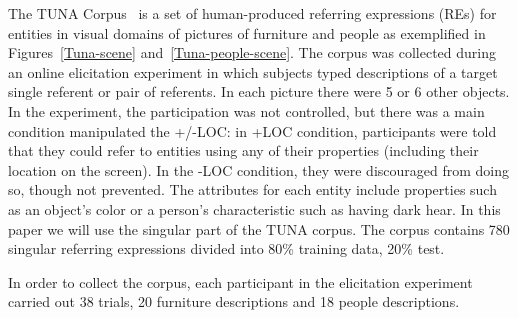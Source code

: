 \label{tunaDescription}The TUNA Corpus~\cite{Gatt:2008:TCO:1708322.1708365} is a set of human-produced referring expressions (REs) for entities in visual domains of pictures of furniture and people as exemplified in Figures~\ref{Tuna-scene} and~\ref{Tuna-people-scene}. The corpus was
collected during an online elicitation experiment in which subjects typed descriptions of a target single referent or pair of referents. 
In each picture there were 5 or 6 other objects. 
In the experiment, the participation was not controlled, but there was a main condition manipulated the +/-LOC: in +LOC condition, participants were told that they could refer to entities using any of their properties (including their location on the screen). In the -LOC condition, they were discouraged from doing so, though not prevented. 
The attributes for each entity include properties such as an object's color or a person's characteristic such as having dark hear.
In this paper we will use the singular part of the TUNA corpus. The corpus contains 780 singular referring expressions divided
into 80\% training data, 20\% test. 

In order to collect the corpus, each participant in the elicitation experiment carried out 38 trials, 20 furniture descriptions and 18 people descriptions.  


